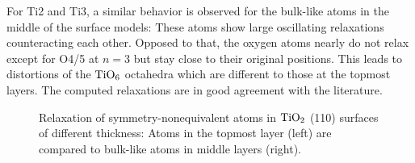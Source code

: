 \documentclass[a4paper,12pt]{scrartcl}
\begin{document}
For Ti2 and Ti3, a similar behavior is observed for the bulk-like atoms in the middle of the surface models: These atoms show large oscillating relaxations counteracting each other. Opposed to that, the oxygen atoms nearly do not relax except for O4/5 at $n=3$ but stay close to their original positions. This leads to distortions of the $ \ce{TiO6} $ octahedra which are different to those at the topmost layers. The computed relaxations are in good agreement with the literature.\autocite{rutile-surface-energy}
%
\begin{figure}[H]
	\centering
	
	\vspace{-20pt}
	\caption{Relaxation of symmetry-nonequivalent atoms in $ \ce{TiO2} $ (110) surfaces of different thickness: Atoms in the topmost layer (left) are compared to bulk-like atoms in middle layers (right).}
	\label{fig:dz}
\end{figure}
%
\end{document}
